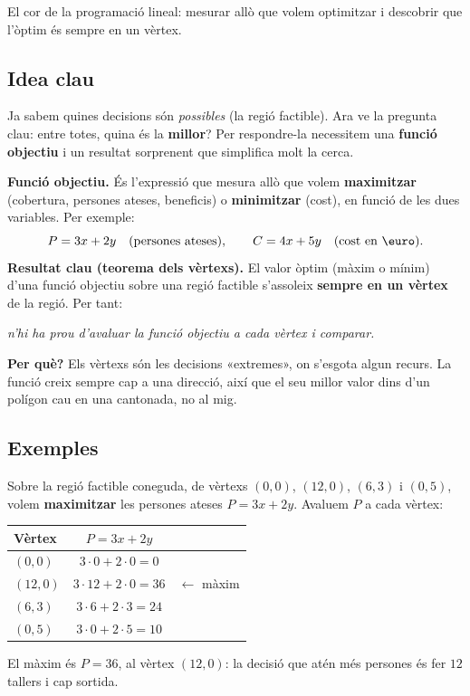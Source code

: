 %
{El cor de la programació lineal: mesurar allò que volem optimitzar i descobrir que l'òptim és sempre en un vèrtex.}

\subsection{Idea clau}

Ja sabem quines decisions són \emph{possibles} (la regió factible). Ara ve la pregunta
clau: entre totes, quina és la \textbf{millor}? Per respondre-la necessitem una
\textbf{funció objectiu} i un resultat sorprenent que simplifica molt la cerca.

\begin{idea}
\textbf{Funció objectiu.} És l'expressió que mesura allò que volem
\textbf{maximitzar} (cobertura, persones ateses, beneficis) o \textbf{minimitzar}
(cost), en funció de les dues variables. Per exemple:
\[
P=3x+2y \quad(\text{persones ateses}),\qquad C=4x+5y \quad(\text{cost en \euro}).
\]
\textbf{Resultat clau (teorema dels vèrtexs).} El valor òptim (màxim o mínim) d'una
funció objectiu sobre una regió factible s'assoleix \textbf{sempre en un vèrtex} de
la regió. Per tant:
\begin{center}
\textit{n'hi ha prou d'avaluar la funció objectiu a cada vèrtex i comparar.}
\end{center}
\textbf{Per què?} Els vèrtexs són les decisions «extremes», on s'esgota algun recurs.
La funció creix sempre cap a una direcció, així que el seu millor valor dins d'un
polígon cau en una cantonada, no al mig.
\end{idea}

\subsection{Exemples}

\begin{exemple}
Sobre la regió factible coneguda, de vèrtexs $(0,0)$, $(12,0)$, $(6,3)$ i $(0,5)$,
volem \textbf{maximitzar} les persones ateses $P=3x+2y$. Avaluem $P$ a cada vèrtex:
\begin{center}
\begin{tabular}{lcl}
\toprule
\textbf{Vèrtex} & $P=3x+2y$ & \\
\midrule
$(0,0)$ & $3\cdot 0+2\cdot 0=0$ & \\
$(12,0)$ & $3\cdot 12+2\cdot 0=36$ & $\leftarrow$ màxim \\
$(6,3)$ & $3\cdot 6+2\cdot 3=24$ & \\
$(0,5)$ & $3\cdot 0+2\cdot 5=10$ & \\
\bottomrule
\end{tabular}
\end{center}
El màxim és $P=36$, al vèrtex $(12,0)$: la decisió que atén més persones és fer
$12$ tallers i cap sortida.
\end{exemple}

